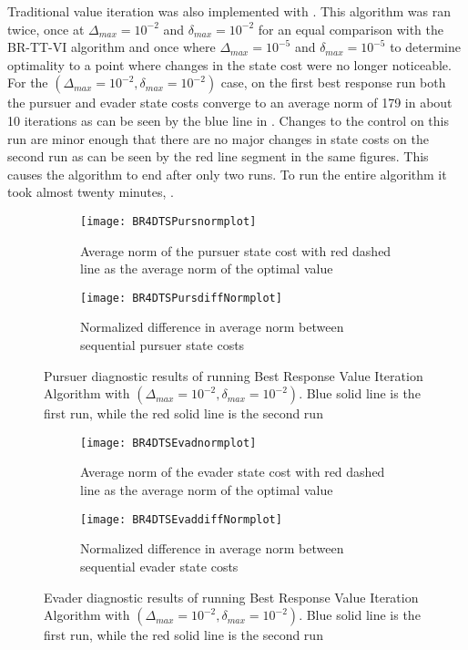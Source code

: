 Traditional value iteration was also implemented with . This algorithm was ran twice, once at $\Delta_{max} = 10^{-2}$ and $\delta_{max} = 10^{-2}$ for an equal comparison with the BR-TT-VI algorithm  and once where $\Delta_{max} = 10^{-5}$ and $\delta_{max} = 10^{-5}$ to determine optimality to a point where changes in the state cost were no longer noticeable. For the $(\Delta_{max} = 10^{-2},\delta_{max} = 10^{-2})$ case, on the first best response run both the pursuer and evader state costs converge to an average norm of 179 in about 10 iterations as can be seen by the blue line in . Changes to the control on this run are minor enough that there are no major changes in state costs on the second run as can be seen by the red line segment in the same figures. This causes the algorithm to end after only two runs. To run the entire algorithm it took almost twenty minutes, . 
\begin{figure}[h!]
\centering
\begin{subfigure}[t]{0.475\textwidth}
	\centering
	\texttt{[image: BR4DTSPursnormplot]}
	\caption{Average norm of the pursuer state cost with red dashed line as the average norm of the optimal value}
	\label{BR4DTSPnp}
\end{subfigure}
\hfill
\begin{subfigure}[t]{0.475\textwidth}
	\centering
	\texttt{[image: BR4DTSPursdiffNormplot]}
	\caption{Normalized difference in average norm between sequential pursuer state costs}
	\label{BR4DTSPdnp}
\end{subfigure}
\caption{Pursuer diagnostic results of running Best Response Value Iteration Algorithm with $(\Delta_{max} = 10^{-2},\delta_{max} = 10^{-2})$. Blue solid line is the first run, while the red solid line is the second run}
\label{BR4DTSPdiag}
\end{figure}
\begin{figure}[h!]
\centering
\begin{subfigure}[t]{0.475\textwidth}
	\centering
	\texttt{[image: BR4DTSEvadnormplot]}
	\caption{Average norm of the evader state cost with red dashed line as the average norm of the optimal value}
	\label{BR4DTSEnp}
\end{subfigure}
\hfill
\begin{subfigure}[t]{0.475\textwidth}
	\centering
	\texttt{[image: BR4DTSEvaddiffNormplot]}
	\caption{Normalized difference in average norm between sequential evader state costs}
	\label{BR4DTSEdnp}
\end{subfigure}
\caption{Evader diagnostic results of running Best Response Value Iteration Algorithm with $(\Delta_{max} = 10^{-2},\delta_{max} = 10^{-2})$. Blue solid line is the first run, while the red solid line is the second run}
\label{BR4DTSEdiag}
\end{figure}

